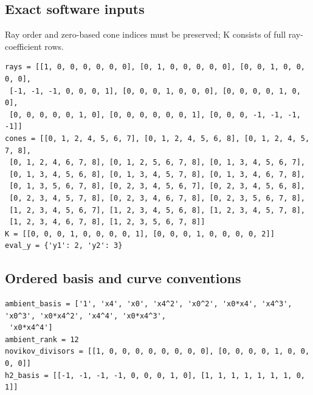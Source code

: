 \documentclass[10pt,a4paper]{article}
\begin{document}
\subsection*{Exact software inputs}
Ray order and zero-based cone indices must be preserved; K consists of full ray-coefficient rows.
\begin{lstlisting}
rays = [[1, 0, 0, 0, 0, 0, 0], [0, 1, 0, 0, 0, 0, 0], [0, 0, 1, 0, 0, 0, 0],
 [-1, -1, -1, 0, 0, 0, 1], [0, 0, 0, 1, 0, 0, 0], [0, 0, 0, 0, 1, 0, 0],
 [0, 0, 0, 0, 0, 1, 0], [0, 0, 0, 0, 0, 0, 1], [0, 0, 0, -1, -1, -1, -1]]
cones = [[0, 1, 2, 4, 5, 6, 7], [0, 1, 2, 4, 5, 6, 8], [0, 1, 2, 4, 5, 7, 8],
 [0, 1, 2, 4, 6, 7, 8], [0, 1, 2, 5, 6, 7, 8], [0, 1, 3, 4, 5, 6, 7],
 [0, 1, 3, 4, 5, 6, 8], [0, 1, 3, 4, 5, 7, 8], [0, 1, 3, 4, 6, 7, 8],
 [0, 1, 3, 5, 6, 7, 8], [0, 2, 3, 4, 5, 6, 7], [0, 2, 3, 4, 5, 6, 8],
 [0, 2, 3, 4, 5, 7, 8], [0, 2, 3, 4, 6, 7, 8], [0, 2, 3, 5, 6, 7, 8],
 [1, 2, 3, 4, 5, 6, 7], [1, 2, 3, 4, 5, 6, 8], [1, 2, 3, 4, 5, 7, 8],
 [1, 2, 3, 4, 6, 7, 8], [1, 2, 3, 5, 6, 7, 8]]
K = [[0, 0, 0, 1, 0, 0, 0, 0, 1], [0, 0, 0, 1, 0, 0, 0, 0, 2]]
eval_y = {'y1': 2, 'y2': 3}
\end{lstlisting}
\subsection*{Ordered basis and curve conventions}
\begin{lstlisting}
ambient_basis = ['1', 'x4', 'x0', 'x4^2', 'x0^2', 'x0*x4', 'x4^3', 'x0^3', 'x0*x4^2', 'x4^4', 'x0*x4^3',
 'x0*x4^4']
ambient_rank = 12
novikov_divisors = [[1, 0, 0, 0, 0, 0, 0, 0, 0], [0, 0, 0, 0, 1, 0, 0, 0, 0]]
h2_basis = [[-1, -1, -1, -1, 0, 0, 0, 1, 0], [1, 1, 1, 1, 1, 1, 1, 0, 1]]
\end{lstlisting}
\end{document}
